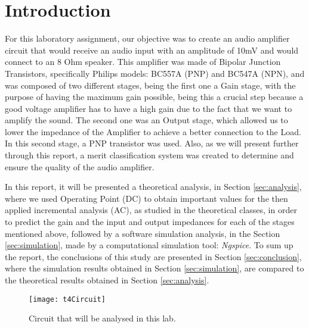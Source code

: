 \newpage
\section{Introduction}
\label{sec:introduction}

For this laboratory assignment, our objective was to create an audio amplifier circuit that would receive an audio input with an amplitude of 10mV and would connect to an 8 Ohm speaker. This amplifier was made of Bipolar Junction Transistors, specifically Philips models: BC557A (PNP) and BC547A (NPN), and was composed of two different stages, being the first one a Gain stage, with the purpose of having the maximum gain possible, being this a crucial step because a good voltage amplifier has to have a high gain due to the fact that we want to amplify the sound. The second one was an Output stage, which allowed us to lower the impedance of the Amplifier to achieve a better connection to the Load. In this second stage, a PNP transistor was used. Also, as we will present further through this report, a merit classification system was created to determine and ensure the quality of the audio amplifier.

In this report, it will be presented a theoretical analysis, in Section \ref{sec:analysis}, where we used Operating Point (DC) to obtain important values for the then applied incremental analysis (AC), as studied in the theoretical classes, in order to predict the gain and the input and output impedances for each of the stages mentioned above, followed by a software simulation analysis, in the Section \ref{sec:simulation}, made by a computational simulation tool: \textit{Ngspice}. To sum up the report, the conclusions of this study are presented in Section \ref{sec:conclusion}, where the simulation results obtained in Section \ref{sec:simulation}, are compared to the theoretical results obtained in Section \ref{sec:analysis}.

\FloatBarrier
\begin{figure}[h] \centering
	\texttt{[image: t4Circuit]}
	\caption{Circuit that will be analysed in this lab.}
	\label{fig:circuit}
\end{figure}
\FloatBarrier
\newpage

